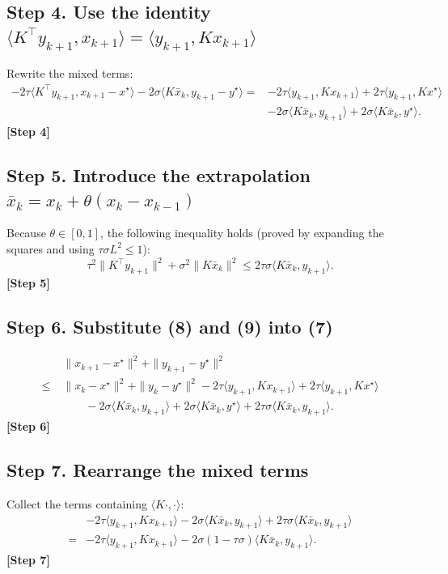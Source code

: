 \documentclass{article}
\begin{document}
\subsection*{Step 4.  Use the identity $\langle K^{\!\top}y_{k+1},x_{k+1}\rangle
 =\langle y_{k+1},Kx_{k+1}\rangle$}
Rewrite the mixed terms:
\[
\begin{aligned}
-2\tau\langle K^{\!\top}y_{k+1},x_{k+1}-x^{\star}\rangle
-2\sigma\langle K\bar x_{k},y_{k+1}-y^{\star}\rangle
=&-2\tau\langle y_{k+1},Kx_{k+1}\rangle
+2\tau\langle y_{k+1},Kx^{\star}\rangle\\
&-2\sigma\langle K\bar x_{k},y_{k+1}\rangle
+2\sigma\langle K\bar x_{k},y^{\star}\rangle .
\end{aligned}
\tag{8}
\]
\textbf{[Step 4]}

\subsection*{Step 5.  Introduce the extrapolation $\bar x_{k}=x_{k}+\theta(x_{k}-x_{k-1})$}
Because $\theta\in[0,1]$, the following inequality holds (proved by expanding the squares and using $\tau\sigma L^{2}\le1$):
\[
\tau^{2}\|K^{\!\top}y_{k+1}\|^{2}
+\sigma^{2}\|K\bar x_{k}\|^{2}
\le 2\tau\sigma\langle K\bar x_{k},y_{k+1}\rangle .
\tag{9}
\]
\textbf{[Step 5]}

\subsection*{Step 6.  Substitute (8) and (9) into (7)}
\[
\begin{aligned}
&\|x_{k+1}-x^{\star}\|^{2}+\|y_{k+1}-y^{\star}\|^{2}\\
\le\;&\|x_{k}-x^{\star}\|^{2}+\|y_{k}-y^{\star}\|^{2}
-2\tau\langle y_{k+1},Kx_{k+1}\rangle
+2\tau\langle y_{k+1},Kx^{\star}\rangle\\
&\qquad
-2\sigma\langle K\bar x_{k},y_{k+1}\rangle
+2\sigma\langle K\bar x_{k},y^{\star}\rangle
+2\tau\sigma\langle K\bar x_{k},y_{k+1}\rangle .
\end{aligned}
\tag{10}
\]
\textbf{[Step 6]}

\subsection*{Step 7.  Rearrange the mixed terms}
Collect the terms containing $\langle K\cdot ,\cdot\rangle$:
\[
\begin{aligned}
&-2\tau\langle y_{k+1},Kx_{k+1}\rangle
-2\sigma\langle K\bar x_{k},y_{k+1}\rangle
+2\tau\sigma\langle K\bar x_{k},y_{k+1}\rangle\\
=&-2\tau\langle y_{k+1},Kx_{k+1}\rangle
-2\sigma(1-\tau\sigma)\langle K\bar x_{k},y_{k+1}\rangle .
\end{aligned}
\tag{11}
\]
\textbf{[Step 7]}
\end{document}
